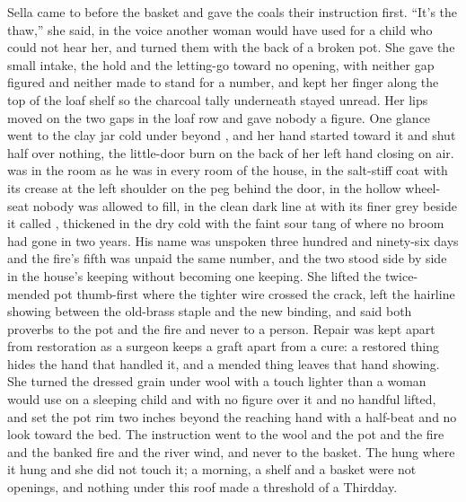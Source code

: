 Sella came to  before the basket and gave the coals their instruction first. “It's the thaw,” she said, in the voice another woman would have used for a child who could not hear her, and turned them with the back of a broken pot. She gave the small intake, the hold and the letting-go toward no opening, with neither gap figured and neither made to stand for a number, and kept her finger along the top of the loaf shelf so the charcoal tally underneath stayed unread. Her lips moved on the two gaps in the loaf row and gave nobody a figure. One glance went to the clay jar cold under  beyond , and her hand started toward it and shut half over nothing, the little-door burn on the back of her left hand closing on air.  was in the room as he was in every room of the house, in the salt-stiff coat with its crease at the left shoulder on the peg behind the door, in the hollow wheel-seat nobody was allowed to fill, in the clean dark line at  with its finer grey beside it called , thickened in the dry cold with the faint sour tang of  where no broom had gone in two years. His name was unspoken three hundred and ninety-six days and the fire's fifth was unpaid the same number, and the two stood side by side in the house's keeping without becoming one keeping. She lifted the twice-mended pot thumb-first where the tighter wire crossed the crack, left the hairline showing between the old-brass staple and the new binding, and said both proverbs to the pot and the fire and never to a person. Repair was kept apart from restoration as a surgeon keeps a graft apart from a cure: a restored thing hides the hand that handled it, and a mended thing leaves that hand showing. She turned the dressed grain under wool with a touch lighter than a woman would use on a sleeping child and with no figure over it and no handful lifted, and set the pot rim two inches beyond the reaching hand with a half-beat and no look toward the bed. The instruction went to the wool and the pot and the fire and the banked fire and the river wind, and never to the basket. The  hung where it hung and she did not touch it; a morning, a shelf and a basket were not openings, and nothing under this roof made a threshold of a Thirdday.

